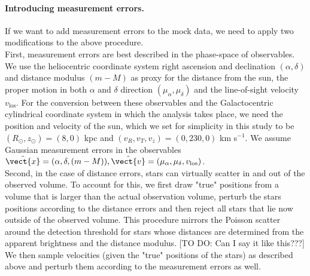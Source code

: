 

\paragraph{Introducing measurement errors.} If we want to add measurement errors to the mock data, we need to apply two modifications to the above procedure.
\\First, measurement errors are best described in the phase-space of observables. We use the heliocentric coordinate system right ascension and declination $(\alpha,\delta)$ and distance modulus $(m-M)$ as proxy for the distance from the sun, the proper motion in both $\alpha$ and $\delta$ direction $(\mu_\alpha,\mu_\delta)$ and the line-of-sight velocity $v_\text{los}$. For the conversion between these observables and the Galactocentric cylindrical coordinate system in which the analysis takes place, we need the position and velocity of the sun, which we set for simplicity in this study to be $(R_\odot,z_\odot)=(8,0)$ kpc and $(v_R,v_T,v_z)=(0,230,0)$ km s$^{-1}$. We assume Gaussian measurement errors in the observables $\tilde{\vect{x}} = (\alpha,\delta,(m-M)), \tilde{\vect{v}} = (\mu_\alpha,\mu_\delta,v_\text{los})$.
\\Second, in the case of distance errors, stars can virtually scatter in and out of the observed volume. To account for this, we first draw "true" positions from a volume that is larger than the actual observation volume, perturb the stars positions according to the distance errors and then reject all stars that lie now outside of the observed volume. This procedure mirrors the Poisson scatter around the detection threshold for stars whose distances are determined from the apparent brightness and the distance modulus. [TO DO: Can I say it like this???] We then sample velocities (given the "true" positions of the stars) as described above and perturb them according to the measurement errors as well.

